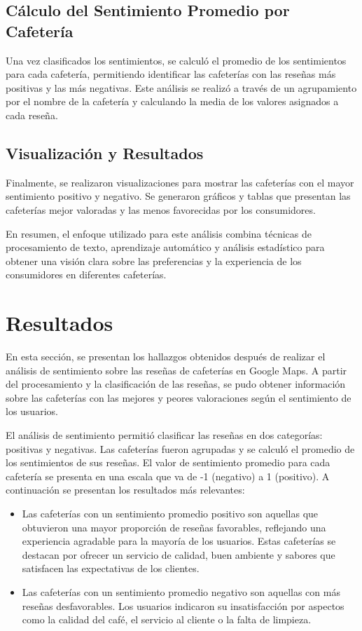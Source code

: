\documentclass[journal]{IEEEtran}
\begin{document}
\subsection{Cálculo del Sentimiento Promedio por Cafetería}
Una vez clasificados los sentimientos, se calculó el promedio de los sentimientos para cada cafetería, permitiendo identificar las cafeterías con las reseñas más positivas y las más negativas. Este análisis se realizó a través de un agrupamiento por el nombre de la cafetería y calculando la media de los valores asignados a cada reseña.
\subsection{Visualización y Resultados}
Finalmente, se realizaron visualizaciones para mostrar las cafeterías con el mayor sentimiento positivo y negativo. Se generaron gráficos y tablas que presentan las cafeterías mejor valoradas y las menos favorecidas por los consumidores.

En resumen, el enfoque utilizado para este análisis combina técnicas de procesamiento de texto, aprendizaje automático y análisis estadístico para obtener una visión clara sobre las preferencias y la experiencia de los consumidores en diferentes cafeterías.

\section{Resultados}
En esta sección, se presentan los hallazgos obtenidos después de realizar el análisis de sentimiento sobre las reseñas de cafeterías en Google Maps. A partir del procesamiento y la clasificación de las reseñas, se pudo obtener información sobre las cafeterías con las mejores y peores valoraciones según el sentimiento de los usuarios.

El análisis de sentimiento permitió clasificar las reseñas en dos categorías: positivas y negativas. Las cafeterías fueron agrupadas y se calculó el promedio de los sentimientos de sus reseñas. El valor de sentimiento promedio para cada cafetería se presenta en una escala que va de -1 (negativo) a 1 (positivo). A continuación se presentan los resultados más relevantes:
\begin{itemize}
    \item Las cafeterías con un sentimiento promedio positivo son aquellas que obtuvieron una mayor proporción de reseñas favorables, reflejando una experiencia agradable para la mayoría de los usuarios. Estas cafeterías se destacan por ofrecer un servicio de calidad, buen ambiente y sabores que satisfacen las expectativas de los clientes.
    \item Las cafeterías con un sentimiento promedio negativo son aquellas con más reseñas desfavorables. Los usuarios indicaron su insatisfacción por aspectos como la calidad del café, el servicio al cliente o la falta de limpieza.
\end{itemize}
\end{document}
